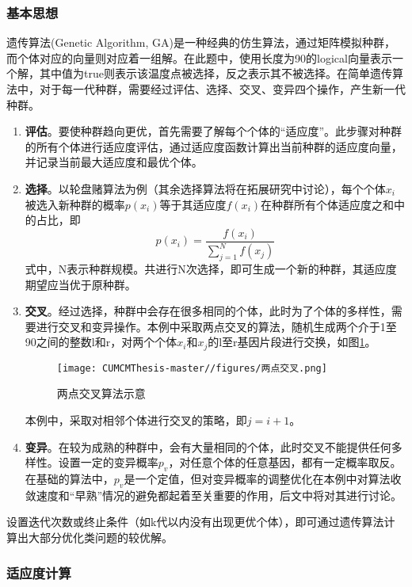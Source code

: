 \documentclass[withoutpreface,bwprint]{cumcmthesis} %
\begin{document}
\subsubsection{基本思想}
遗传算法(Genetic Algorithm, GA)是一种经典的仿生算法，通过矩阵模拟种群，而个体对应的向量则对应着一组解。在此题中，使用长度为90的logical向量表示一个解，其中值为true则表示该温度点被选择，反之表示其不被选择。在简单遗传算法中，对于每一代种群，需要经过评估、选择、交叉、变异四个操作，产生新一代种群。
\begin{enumerate}
    \item \textbf{评估}。要使种群趋向更优，首先需要了解每个个体的“适应度”。此步骤对种群的所有个体进行适应度评估，通过适应度函数计算出当前种群的适应度向量，并记录当前最大适应度和最优个体。
    \item \textbf{选择}。以轮盘赌算法为例（其余选择算法将在拓展研究中讨论），每个个体$x_i$被选入新种群的概率$p(x_i)$等于其适应度$f(x_i)$在种群所有个体适应度之和中的占比，即
    \begin{equation}\label{eqn-1}
    p(x_i)=\frac{f(x_i)}{\sum_{j=1}^N f(x_j)}
    \end{equation}
    式中，N表示种群规模。共进行N次选择，即可生成一个新的种群，其适应度期望应当优于原种群。
    \item \textbf{交叉}。经过选择，种群中会存在很多相同的个体，此时为了个体的多样性，需要进行交叉和变异操作。本例中采取两点交叉的算法，随机生成两个介于1至90之间的整数l和r，对两个个体$x_i$和$x_j$的l至r基因片段进行交换，如图\ref{fig:exchange}。
    \begin{figure}[htbp]
        \centering
        \texttt{[image: CUMCMThesis-master//figures/两点交叉.png]}
        \caption{两点交叉算法示意}
        \label{fig:exchange}
    \end{figure}
    本例中，采取对相邻个体进行交叉的策略，即$j=i+1$。
    \item \textbf{变异}。在较为成熟的种群中，会有大量相同的个体，此时交叉不能提供任何多样性。设置一定的变异概率$p_v$，对任意个体的任意基因，都有一定概率取反。在基础的算法中，$p_v$是一个定值，但对变异概率的调整优化在本例中对算法收敛速度和“早熟”情况的避免都起着至关重要的作用，后文中将对其进行讨论。
\end{enumerate}

设置迭代次数或终止条件（如k代以内没有出现更优个体），即可通过遗传算法计算出大部分优化类问题的较优解。

\subsubsection{适应度计算}
\end{document}
